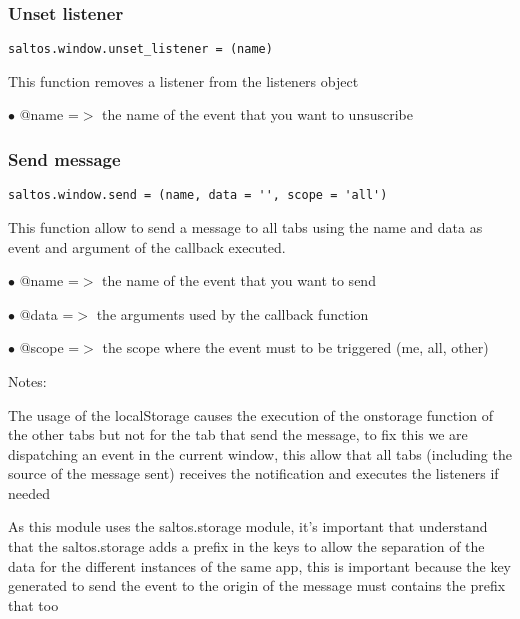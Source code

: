 \documentclass[a4paper]{article}
\begin{document}
\hypertarget{toc867}{}
\subsubsection{Unset listener}

\begin{lstlisting}
saltos.window.unset_listener = (name)
\end{lstlisting}

This function removes a listener from the listeners object

\begin{compactitem}
\item[\color{myblue}$\bullet$] @name =$>$ the name of the event that you want to unsuscribe
\end{compactitem}

\hypertarget{toc868}{}
\subsubsection{Send message}

\begin{lstlisting}
saltos.window.send = (name, data = '', scope = 'all')
\end{lstlisting}

This function allow to send a message to all tabs using the name and data
as event and argument of the callback executed.

\begin{compactitem}
\item[\color{myblue}$\bullet$] @name  =$>$ the name of the event that you want to send
\item[\color{myblue}$\bullet$] @data  =$>$ the arguments used by the callback function
\item[\color{myblue}$\bullet$] @scope =$>$ the scope where the event must to be triggered (me, all, other)
\end{compactitem}

Notes:

The usage of the localStorage causes the execution of the onstorage function
of the other tabs but not for the tab that send the message, to fix this we
are dispatching an event in the current window, this allow that all tabs
(including the source of the message sent) receives the notification and
executes the listeners if needed

As this module uses the saltos.storage module, it's important that understand
that the saltos.storage adds a prefix in the keys to allow the separation of
the data for the different instances of the same app, this is important because
the key generated to send the event to the origin of the message must contains
the prefix that too
\end{document}
